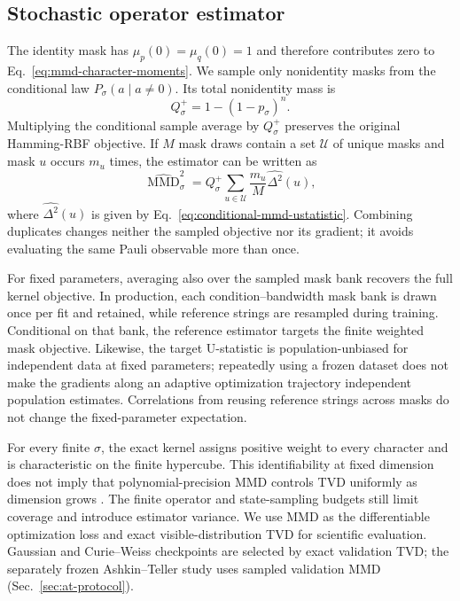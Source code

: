 \documentclass[pra,aps,10pt,twocolumn,floatfix,superscriptaddress,
notitlepage,longbibliography]{revtex4-2}
\newcommand{\mmd}{\operatorname{MMD}}
\begin{document}
\subsection{Stochastic operator estimator}

The identity mask has $\mu_p(0)=\mu_q(0)=1$ and therefore contributes zero to Eq.~\eqref{eq:mmd-character-moments}. We sample only nonidentity masks from the conditional law $P_\sigma(a\mid a\ne0)$. Its total nonidentity mass is
\begin{equation}
    Q_\sigma^+=1-(1-p_\sigma)^n.
    \label{eq:mmd-nonidentity-mass}
\end{equation}
Multiplying the conditional sample average by $Q_\sigma^+$ preserves the original Hamming-RBF objective. If $M$ mask draws contain a set $\mathcal U$ of unique masks and mask $u$ occurs $m_u$ times, the estimator can be written as
\begin{equation}
    \widehat{\mmd}_\sigma^2
    =Q_\sigma^+\sum_{u\in\mathcal U}\frac{m_u}{M}
    \widehat{\Delta^2}(u),
    \label{eq:compressed-mmd-estimator}
\end{equation}
where $\widehat{\Delta^2}(u)$ is given by Eq.~\eqref{eq:conditional-mmd-ustatistic}. Combining duplicates changes neither the sampled objective nor its gradient; it avoids evaluating the same Pauli observable more than once.

For fixed parameters, averaging also over the sampled mask bank recovers the full kernel objective. In production, each condition--bandwidth mask bank is drawn once per fit and retained, while reference strings are resampled during training. Conditional on that bank, the reference estimator targets the finite weighted mask objective. Likewise, the target U-statistic is population-unbiased for independent data at fixed parameters; repeatedly using a frozen dataset does not make the gradients along an adaptive optimization trajectory independent population estimates. Correlations from reusing reference strings across masks do not change the fixed-parameter expectation.

For every finite $\sigma$, the exact kernel assigns positive weight to every character and is characteristic on the finite hypercube. This identifiability at fixed dimension does not imply that polynomial-precision MMD controls TVD uniformly as dimension grows \cite{kurkinUniversalityKernelAdaptive2025}. The finite operator and state-sampling budgets still limit coverage and introduce estimator variance. We use MMD as the differentiable optimization loss and exact visible-distribution TVD for scientific evaluation. Gaussian and Curie--Weiss checkpoints are selected by exact validation TVD; the separately frozen Ashkin--Teller study uses sampled validation MMD (Sec.~\ref{sec:at-protocol}).
\end{document}
